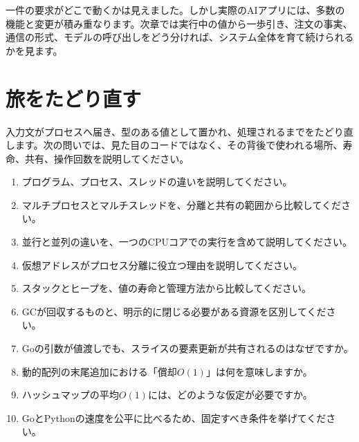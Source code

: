 一件の要求がどこで動くかは見えました。しかし実際のAIアプリには、多数の機能と変更が積み重なります。次章では実行中の値から一歩引き、注文の事実、通信の形式、モデルの呼び出しをどう分ければ、システム全体を育て続けられるかを見ます。



\section{旅をたどり直す}
\label{sec:03-runtime-data-21}

入力文がプロセスへ届き、型のある値として置かれ、処理されるまでをたどり直します。次の問いでは、見た目のコードではなく、その背後で使われる場所、寿命、共有、操作回数を説明してください。

\begingroup
  \begin{enumerate}
    \item プログラム、プロセス、スレッドの違いを説明してください。
    \item マルチプロセスとマルチスレッドを、分離と共有の範囲から比較してください。
    \item 並行と並列の違いを、一つのCPUコアでの実行を含めて説明してください。
    \item 仮想アドレスがプロセス分離に役立つ理由を説明してください。
    \item スタックとヒープを、値の寿命と管理方法から比較してください。
    \item GCが回収するものと、明示的に閉じる必要がある資源を区別してください。
    \item Goの引数が値渡しでも、スライスの要素更新が共有されるのはなぜですか。
    \item 動的配列の末尾追加における「償却$O(1)$」は何を意味しますか。
    \item ハッシュマップの平均$O(1)$には、どのような仮定が必要ですか。
    \item GoとPythonの速度を公平に比べるため、固定すべき条件を挙げてください。
  \end{enumerate}
\par
\endgroup


